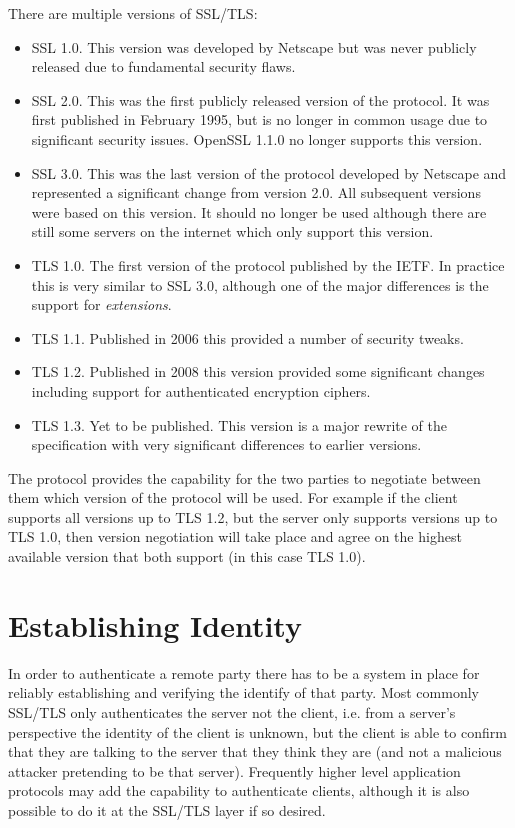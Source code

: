 There are multiple versions of SSL/TLS:
\begin{itemize}
\item SSL 1.0. This version was developed by Netscape but was never publicly 
released due to fundamental security flaws.
\item SSL 2.0. This was the first publicly released version of the protocol. It 
was first published in February 1995, but is no longer in common usage due to 
significant security issues. OpenSSL 1.1.0 no longer supports this version.
\item SSL 3.0. This was the last version of the protocol developed by Netscape 
and represented a significant change from version 2.0. All subsequent versions 
were based on this version. It should no longer be used although there are 
still some servers on the internet which only support this version.
\item TLS 1.0. The first version of the protocol published by the IETF. In 
practice this is very similar to SSL 3.0, although one of the major differences 
is the support for \emph{extensions}.
\item TLS 1.1. Published in 2006 this provided a number of security tweaks.
\item TLS 1.2. Published in 2008 this version provided some significant changes
including  support for authenticated encryption ciphers.
\item TLS 1.3. Yet to be published. This version is a major rewrite of the
specification with very significant differences to earlier versions.
\end{itemize}

The protocol provides the capability for the two parties to negotiate between 
them which version of the protocol will be used. For example if the client 
supports all versions up to TLS 1.2, but the server only supports versions up 
to TLS 1.0, then version negotiation will take place and agree on the highest 
available version that both support (in this case TLS 1.0).

\section{Establishing Identity}

In order to authenticate a remote party there has to be a system in place for 
reliably establishing and verifying the identify of that party. Most commonly 
SSL/TLS only authenticates the server not the client, i.e. from a server's 
perspective the identity of the client is unknown, but the client is able to 
confirm that they are talking to the server that they think they are (and not a 
malicious attacker pretending to be that server). Frequently higher level 
application protocols may add the capability to authenticate clients, although
it is also possible to do it at the SSL/TLS layer if so desired.

